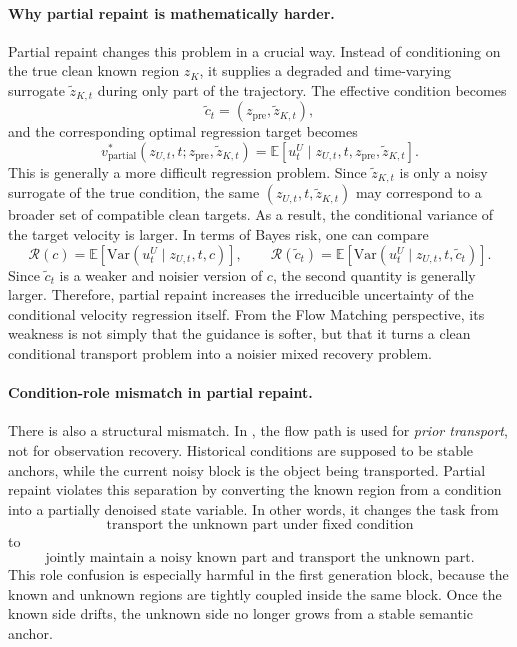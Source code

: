 \paragraph{Why partial repaint is mathematically harder.}
Partial repaint changes this problem in a crucial way. Instead of conditioning on the true clean known region \(z_K\), it supplies a degraded and time-varying surrogate \(\tilde z_{K,t}\) during only part of the trajectory. The effective condition becomes
\[
\tilde c_t = (z_{\mathrm{pre}}, \tilde z_{K,t}),
\]
and the corresponding optimal regression target becomes
\[
v^*_{\mathrm{partial}}(z_{U,t}, t; z_{\mathrm{pre}}, \tilde z_{K,t})
=
\mathbb{E}[u_t^U \mid z_{U,t}, t, z_{\mathrm{pre}}, \tilde z_{K,t}].
\]
This is generally a more difficult regression problem. Since \(\tilde z_{K,t}\) is only a noisy surrogate of the true condition, the same \((z_{U,t}, t, \tilde z_{K,t})\) may correspond to a broader set of compatible clean targets. As a result, the conditional variance of the target velocity is larger. In terms of Bayes risk, one can compare
\[
\mathcal{R}(c)
=
\mathbb{E}\!\left[\mathrm{Var}(u_t^U \mid z_{U,t}, t, c)\right],
\qquad
\mathcal{R}(\tilde c_t)
=
\mathbb{E}\!\left[\mathrm{Var}(u_t^U \mid z_{U,t}, t, \tilde c_t)\right].
\]
Since \(\tilde c_t\) is a weaker and noisier version of \(c\), the second quantity is generally larger. Therefore, partial repaint increases the irreducible uncertainty of the conditional velocity regression itself. From the Flow Matching perspective, its weakness is not simply that the guidance is softer, but that it turns a clean conditional transport problem into a noisier mixed recovery problem.

\paragraph{Condition-role mismatch in partial repaint.}
There is also a structural mismatch. In \method, the flow path is used for \emph{prior transport}, not for observation recovery. Historical conditions are supposed to be stable anchors, while the current noisy block is the object being transported. Partial repaint violates this separation by converting the known region from a condition into a partially denoised state variable. In other words, it changes the task from
\[
\text{transport the unknown part under fixed condition}
\]
to
\[
\text{jointly maintain a noisy known part and transport the unknown part}.
\]
This role confusion is especially harmful in the first generation block, because the known and unknown regions are tightly coupled inside the same block. Once the known side drifts, the unknown side no longer grows from a stable semantic anchor.

